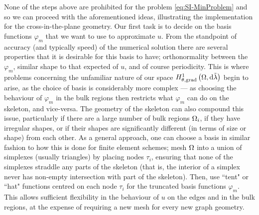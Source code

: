 None of the steps above are prohibited for the problem \eqref{eq:SI-MinProblem} and so we can proceed with the aforementioned ideas, illustrating the implementation for the cross-in-the-plane geometry.
Our first task is to decide on the basis functions $\varphi_m$ that we want to use to approximate $u$.
From the standpoint of accuracy (and typically speed) of the numerical solution there are several properties that it is desirable for this basis to have; orthonormality between the $\varphi_m$, similar shape to that expected of $u$, and of course periodicity.
This is where problems concerning the unfamiliar nature of our space $H^1_{\theta, \mathrm{grad}}\left( \Omega, \mathrm{d}\tilde{\lambda} \right)$ begin to arise, as the choice of basis is considerably more complex --- as choosing the behaviour of $\varphi_m$ in the bulk regions then restricts what $\varphi_m$ can do on the skeleton, and vice-versa. 
The geometry of the skeleton can also compound this issue, particularly if there are a large number of bulk regions $\Omega_i$, if they have irregular shapes, or if their shapes are significantly different (in terms of size or shape) from each other.
As a general approach, one can choose a basis in similar fashion to how this is done for finite element schemes; mesh $\Omega$ into a union of simplexes (usually triangles) by placing nodes $\tau_i$, ensuring that none of the simplexes straddle any parts of the skeleton (that is, the interior of a simplex never has non-empty intersection with part of the skeleton).
Then, use ``tent" or ``hat" functions centred on each node $\tau_i$ for the truncated basis functions $\varphi_m$.
This allows sufficient flexibility in the behaviour of $u$ on the edges and in the bulk regions, at the expense of requiring a new mesh for every new graph geometry.

